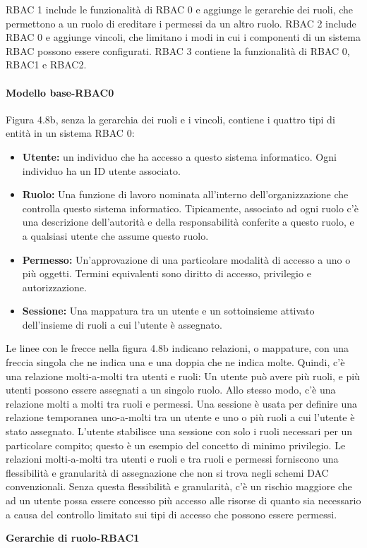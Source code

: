 \singlespacing

RBAC 1 include le funzionalità di RBAC 0 e aggiunge le gerarchie dei ruoli, che permettono a un ruolo di ereditare i permessi da un altro ruolo. RBAC 2 include RBAC 0 e aggiunge vincoli, che limitano i modi in cui i componenti di un sistema RBAC possono essere configurati. RBAC 3 contiene la funzionalità di RBAC 0, RBAC1 e RBAC2.

\singlespacing

\paragraph{Modello base-RBAC0}

Figura 4.8b, senza la gerarchia dei ruoli e i vincoli, contiene i quattro tipi di entità in un sistema RBAC 0:
\begin{itemize}

    \item \textbf{Utente:} un individuo che ha accesso a questo sistema informatico. Ogni individuo ha un ID utente associato.
    
    \item \textbf{Ruolo:} Una funzione di lavoro nominata all'interno dell'organizzazione che controlla questo sistema informatico. Tipicamente, associato ad ogni ruolo c'è una descrizione dell'autorità e della responsabilità conferite a questo ruolo, e a qualsiasi utente che assume questo ruolo.
    
    \item \textbf{Permesso:} Un'approvazione di una particolare modalità di accesso a uno o più oggetti. Termini equivalenti sono diritto di accesso, privilegio e autorizzazione.
    
    \item \textbf{Sessione:} Una mappatura tra un utente e un sottoinsieme attivato dell'insieme di ruoli a cui l'utente è assegnato.
    
\end{itemize}

Le linee con le frecce nella figura 4.8b indicano relazioni, o mappature, con una freccia singola che ne indica una e una doppia che ne indica molte. Quindi, c'è una relazione molti-a-molti tra utenti e ruoli: Un utente può avere più ruoli, e più utenti possono essere assegnati a un singolo ruolo. Allo stesso modo, c'è una relazione molti a molti tra ruoli e permessi. Una sessione è usata per definire una relazione temporanea uno-a-molti tra un utente e uno o più ruoli a cui l'utente è stato assegnato. L'utente stabilisce una sessione con solo i ruoli necessari per un particolare compito; questo è un esempio del concetto di minimo privilegio. Le relazioni molti-a-molti tra utenti e ruoli e tra ruoli e permessi forniscono una flessibilità e granularità di assegnazione che non si trova negli schemi DAC convenzionali. Senza questa flessibilità e granularità, c'è un rischio maggiore che ad un utente possa essere concesso più accesso alle risorse di quanto sia necessario a causa del controllo limitato sui tipi di accesso che possono essere permessi. 
\newpage
\begin{center}
    \textbf{Gerarchie di ruolo-RBAC1}
\end{center}

